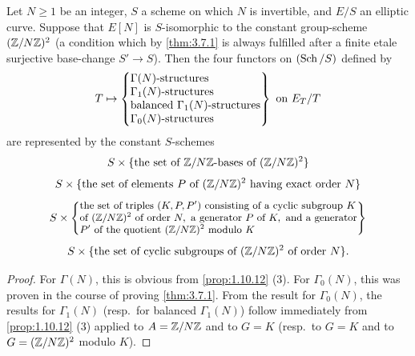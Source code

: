 \begin{corollary}\label{cor:3.7.2}
Let $N \ge 1$ be an integer, $S$ a scheme on which $N$ is invertible, and $E/S$ an elliptic curve. Suppose that $E[N]$ is $S$-isomorphic to the constant group-scheme $(\mathbb{Z}/N\mathbb{Z})^2$ (a condition which by \ref{thm:3.7.1} is always fulfilled after a finite etale surjective base-change $S' \to S$). Then the four functors on $(\operatorname{Sch}/S)$ defined by
\[
T \mapsto \left\{\begin{array}{@{}l@{}}
\Gamma(N)\text{-structures} \\
\Gamma_1(N)\text{-structures} \\
\text{balanced } \Gamma_1(N)\text{-structures} \\
\Gamma_0(N)\text{-structures}
\end{array}\right\} \text{ on } E_T/T
\]
are represented by the constant $S$-schemes
\[
S \times \{\text{the set of } \mathbb{Z}/N\mathbb{Z}\text{-bases of } (\mathbb{Z}/N\mathbb{Z})^2\}
\]
\[
S \times \{\text{the set of elements } P \text{ of } (\mathbb{Z}/N\mathbb{Z})^2 \text{ having exact order } N\}
\]
\[
\small S \times \left\{\begin{array}{@{}l@{}}
\text{the set of triples } (K, P, P') \text{ consisting of a cyclic subgroup } K \\
\text{of } (\Z/N\Z)^2 \text{ of order } N, \text{ a generator } P \text{ of } K, \text{ and a generator} \\
P' \text{ of the quotient } (\Z/N\Z)^2 \text{ modulo } K
\end{array}\right\}
\]
\[
S \times \{\text{the set of cyclic subgroups of } (\mathbb{Z}/N\mathbb{Z})^2 \text{ of order } N\}.
\]
\end{corollary}

\begin{proof}
For $\Gamma(N)$, this is obvious from \ref{prop:1.10.12} (3). For $\Gamma_0(N)$, this was proven in the course of proving \ref{thm:3.7.1}. From the result for $\Gamma_0(N)$, the results for $\Gamma_1(N)$ (resp.\ for balanced $\Gamma_1(N)$) follow immediately from \ref{prop:1.10.12} (3) applied to $A = \mathbb{Z}/N\mathbb{Z}$ and to $G = K$ (resp.\ to $G = K$ and to $G = (\mathbb{Z}/N\mathbb{Z})^2$ modulo $K$).
\end{proof}
